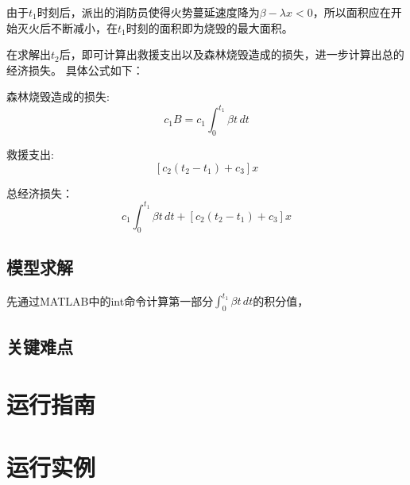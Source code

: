 \documentclass[UTF8]{article}
\begin{document}
        由于$t_1$时刻后，派出的消防员使得火势蔓延速度降为$\beta - \lambda x < 0$，所以面积应在开始灭火后不断减小，在$t_1$时刻的面积即为烧毁的最大面积。
        
        在求解出$t_2$后，即可计算出救援支出以及森林烧毁造成的损失，进一步计算出总的经济损失。
        具体公式如下：
        
        森林烧毁造成的损失:
        $$c_1 B = c_1 \int_{0}^{t_1}\beta t \,dt$$
        
        救援支出:
        $$[c_2(t_2 - t_1) + c_3]x$$
        
        总经济损失：
        $$c_1 \int_{0}^{t_1}\beta t \,dt + [c_2(t_2 - t_1) + c_3]x$$


        \subsection{模型求解}
        先通过MATLAB中的int命令计算第一部分$\int_{0}^{t_1}\beta t \,dt$的积分值，

        \subsection{关键难点}


    \section{运行指南}


    \section{运行实例}
    




        
    
\end{document}
